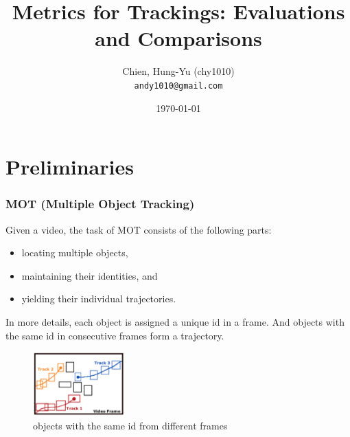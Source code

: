 \documentclass[slidestop, mathserif]{beamer}
\title[Metrics for Tracking]{Metrics for Trackings: Evaluations and Comparisons}
\author[chy1010]{Chien, Hung-Yu (chy1010) \\ {\tt andy1010@gmail.com}}
\date{\today}
\begin{document}
\begin{frame}
    \titlepage
\end{frame}


\section{Preliminaries}

\begin{frame}
	\frametitle{MOT (Multiple Object Tracking)}

	Given a video, the task of MOT consists of the following parts:
	\begin{itemize}
		\item locating multiple objects,
		\item maintaining their identities, and
		\item yielding their individual trajectories.
	\end{itemize}

    In more details, each object is assigned a unique id in a frame.
    And objects with the same id in consecutive frames form a trajectory.

    \begin{figure}
        \includegraphics[height=70pt]{pics/fig1.png}
        \caption{objects with the same id from different frames}
    \end{figure}

\end{frame}
\end{document}
